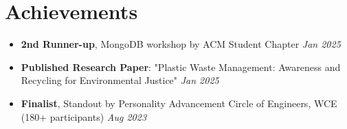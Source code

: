 \documentclass[a4paper, 8pt]{article}
\begin{document}
\section*{Achievements}
\begin{itemize}
    \item \textbf{2nd Runner-up}, MongoDB workshop by ACM Student Chapter \hfill \textit{Jan 2025}
    \item \textbf{Published Research Paper}: "Plastic Waste Management: Awareness and Recycling for Environmental Justice" \hfill \textit{Jan 2025}
    \item \textbf{Finalist}, Standout by Personality Advancement Circle of Engineers, WCE (180+ participants) \hfill \textit{Aug 2023}
\end{itemize}
\end{document}
